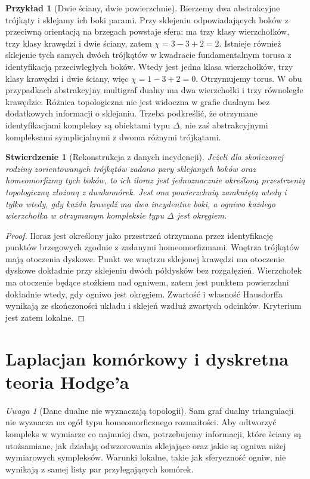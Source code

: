 \documentclass[11pt,a4paper]{report}
\numberwithin{equation}{section}
\theoremstyle{plain}
\newtheorem{stwierdzenie}[twierdzenie]{Stwierdzenie}
\theoremstyle{definition}
\newtheorem{przyklad}[twierdzenie]{Przykład}
\theoremstyle{remark}
\newtheorem{uwaga}[twierdzenie]{Uwaga}
\begin{document}
\begin{przyklad}[Dwie ściany, dwie powierzchnie]
Bierzemy dwa abstrakcyjne trójkąty i sklejamy ich
boki parami. Przy sklejeniu odpowiadających boków
z przeciwną orientacją na brzegach powstaje sfera:
ma trzy klasy wierzchołków, trzy klasy krawędzi
i dwie ściany, zatem $\chi=3-3+2=2$.
Istnieje również sklejenie tych samych dwóch trójkątów
w kwadracie fundamentalnym torusa z identyfikacją
przeciwległych boków. Wtedy jest jedna klasa wierzchołków,
trzy klasy krawędzi i dwie ściany, więc
$\chi=1-3+2=0$. Otrzymujemy torus.
W obu przypadkach abstrakcyjny multigraf dualny
ma dwa wierzchołki i trzy równoległe krawędzie.
Różnica topologiczna nie jest widoczna w grafie
dualnym bez dodatkowych informacji o sklejaniu.
Trzeba podkreślić, że otrzymane identyfikacjami
kompleksy są obiektami typu $\Delta$, nie zaś
abstrakcyjnymi kompleksami symplicjalnymi z dwoma
różnymi trójkątami.
\end{przyklad}

\begin{stwierdzenie}[Rekonstrukcja z danych incydencji]
Jeżeli dla skończonej rodziny zorientowanych trójkątów
zadano pary sklejanych boków oraz homeomorfizmy
tych boków, to ich iloraz jest jednoznacznie określoną
przestrzenią topologiczną złożoną z dwukomórek.
Jest ona powierzchnią zamkniętą wtedy i tylko wtedy,
gdy każda krawędź ma dwa incydentne boki, a ogniwo
każdego wierzchołka w otrzymanym kompleksie typu
$\Delta$ jest okręgiem.
\end{stwierdzenie}

\begin{proof}
Iloraz jest określony jako przestrzeń otrzymana przez
identyfikację punktów brzegowych zgodnie z zadanymi
homeomorfizmami. Wnętrza trójkątów mają otoczenia
dyskowe. Punkt we wnętrzu sklejonej krawędzi ma
otoczenie dyskowe dokładnie przy sklejeniu dwóch
półdysków bez rozgałęzień. Wierzchołek ma otoczenie
będące stożkiem nad ogniwem, zatem jest punktem
powierzchni dokładnie wtedy, gdy ogniwo jest
okręgiem. Zwartość i własność Hausdorffa wynikają
ze skończoności układu i sklejeń wzdłuż zwartych
odcinków. Kryterium jest zatem lokalne.
\end{proof}

\section{Laplacjan komórkowy i dyskretna teoria Hodge'a}
\label{sec:tg-cellular-hodge}

\begin{uwaga}[Dane dualne nie wyznaczają topologii]
Sam graf dualny triangulacji nie wyznacza na ogół typu
homeomorficznego rozmaitości. Aby odtworzyć kompleks
w wymiarze co najmniej dwa, potrzebujemy informacji,
które ściany są utożsamiane, jak działają odwzorowania
sklejające oraz jakie są ogniwa niżej wymiarowych sympleksów.
Warunki lokalne, takie jak sferyczność ogniw, nie wynikają
z samej listy par przylegających komórek.
\end{uwaga}
\end{document}
